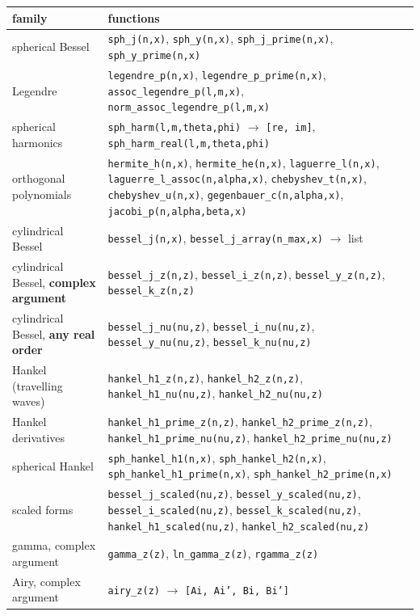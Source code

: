 \documentclass[11pt]{article}
\newcommand{\code}[1]{\texttt{#1}}
\begin{document}
\begin{center}
\begin{tabular}{lp{9.4cm}}
\textbf{family} & \textbf{functions}\\
\hline
spherical Bessel & \code{sph\_j(n,x)}, \code{sph\_y(n,x)},
  \code{sph\_j\_prime(n,x)}, \code{sph\_y\_prime(n,x)}\\
Legendre & \code{legendre\_p(n,x)}, \code{legendre\_p\_prime(n,x)},
  \code{assoc\_legendre\_p(l,m,x)}, \code{norm\_assoc\_legendre\_p(l,m,x)}\\
spherical harmonics & \code{sph\_harm(l,m,theta,phi)} $\to$
  \code{[re, im]}, \code{sph\_harm\_real(l,m,theta,phi)}\\
orthogonal polynomials & \code{hermite\_h(n,x)}, \code{hermite\_he(n,x)},
  \code{laguerre\_l(n,x)}, \code{laguerre\_l\_assoc(n,alpha,x)},
  \code{chebyshev\_t(n,x)}, \code{chebyshev\_u(n,x)},
  \code{gegenbauer\_c(n,alpha,x)}, \code{jacobi\_p(n,alpha,beta,x)}\\
cylindrical Bessel & \code{bessel\_j(n,x)},
  \code{bessel\_j\_array(n\_max,x)} $\to$ list\\
cylindrical Bessel, \textbf{complex argument} &
  \code{bessel\_j\_z(n,z)}, \code{bessel\_i\_z(n,z)},
  \code{bessel\_y\_z(n,z)}, \code{bessel\_k\_z(n,z)}\\
cylindrical Bessel, \textbf{any real order} &
  \code{bessel\_j\_nu(nu,z)}, \code{bessel\_i\_nu(nu,z)},
  \code{bessel\_y\_nu(nu,z)}, \code{bessel\_k\_nu(nu,z)}\\
Hankel (travelling waves) &
  \code{hankel\_h1\_z(n,z)}, \code{hankel\_h2\_z(n,z)},
  \code{hankel\_h1\_nu(nu,z)}, \code{hankel\_h2\_nu(nu,z)}\\
Hankel derivatives &
  \code{hankel\_h1\_prime\_z(n,z)}, \code{hankel\_h2\_prime\_z(n,z)},
  \code{hankel\_h1\_prime\_nu(nu,z)},
  \code{hankel\_h2\_prime\_nu(nu,z)}\\
spherical Hankel &
  \code{sph\_hankel\_h1(n,x)}, \code{sph\_hankel\_h2(n,x)},
  \code{sph\_hankel\_h1\_prime(n,x)},
  \code{sph\_hankel\_h2\_prime(n,x)}\\
scaled forms &
  \code{bessel\_j\_scaled(nu,z)}, \code{bessel\_y\_scaled(nu,z)},
  \code{bessel\_i\_scaled(nu,z)}, \code{bessel\_k\_scaled(nu,z)},
  \code{hankel\_h1\_scaled(nu,z)}, \code{hankel\_h2\_scaled(nu,z)}\\
gamma, complex argument &
  \code{gamma\_z(z)}, \code{ln\_gamma\_z(z)}, \code{rgamma\_z(z)}\\
Airy, complex argument &
  \code{airy\_z(z)} $\to$ \code{[Ai, Ai', Bi, Bi']}\\

\end{tabular}
\end{center}
\end{document}
